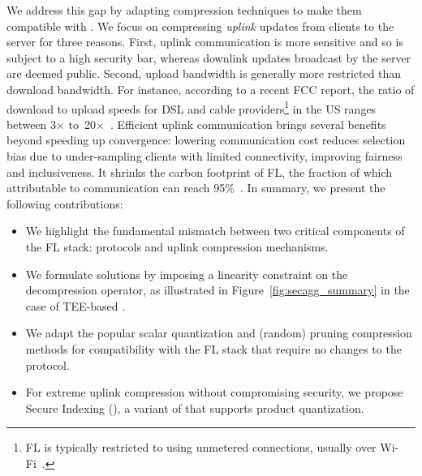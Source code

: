 We address this gap by adapting compression techniques to make them compatible with \SecAgg. We focus on compressing \emph{uplink} updates from clients to the server for three reasons. 
First, uplink communication is more sensitive and so is subject to a high security bar, whereas downlink updates broadcast by the server are deemed public. 
Second, upload bandwidth is generally more restricted than download bandwidth. For instance, according to 
a recent FCC report, 
the ratio of download to upload speeds for DSL and cable providers\footnote{FL is typically restricted to using unmetered connections, usually over Wi-Fi~\citep{huba2021papaya}.} in the US ranges between 3$\times$ to~20$\times$~\citep{fcc-broadband}.
Efficient uplink communication brings several benefits beyond speeding up convergence: 
lowering communication cost reduces selection bias due to under-sampling clients with limited connectivity, improving fairness and inclusiveness. 
It shrinks the carbon footprint of FL, the fraction of which attributable to communication can reach 95\%~\citep{qiu2021first}.
In summary, we present the following contributions: 
\begin{itemize}
    \item We highlight the fundamental mismatch between two critical components of the FL stack: \SecAgg protocols and uplink compression mechanisms.
    
    \item We formulate solutions by imposing a linearity constraint on the decompression operator, as illustrated in Figure~\ref{fig:secagg_summary} in the case of TEE-based \SecAgg.
    
    \item We adapt the popular scalar quantization and (random) pruning compression methods for compatibility with the FL stack that require no changes to the \SecAgg protocol.
    
    \item For extreme uplink compression without compromising security, we propose Secure Indexing (\SecInd), a variant of \SecAgg that supports product quantization. %
\end{itemize}

